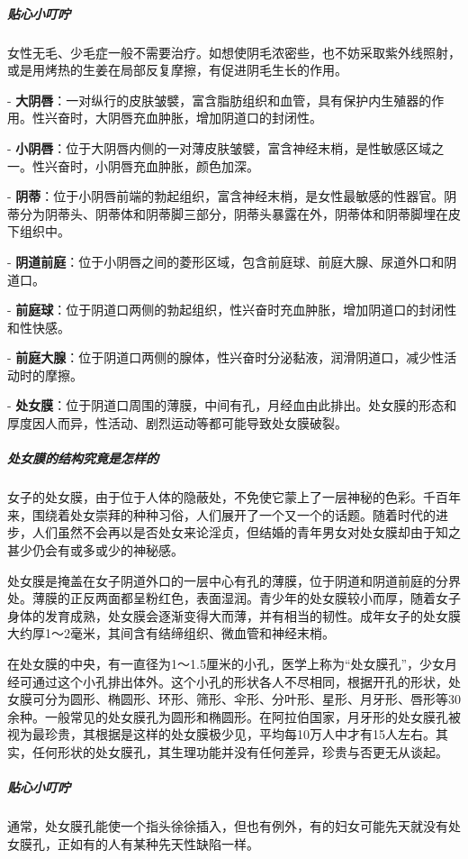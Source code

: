 \begin{enumerate}
\subparagraph{贴心小叮咛}

女性无毛、少毛症一般不需要治疗。如想使阴毛浓密些，也不妨采取紫外线照射，或是用烤热的生姜在局部反复摩擦，有促进阴毛生长的作用。

- \textbf{大阴唇}：一对纵行的皮肤皱襞，富含脂肪组织和血管，具有保护内生殖器的作用。性兴奋时，大阴唇充血肿胀，增加阴道口的封闭性。

- \textbf{小阴唇}：位于大阴唇内侧的一对薄皮肤皱襞，富含神经末梢，是性敏感区域之一。性兴奋时，小阴唇充血肿胀，颜色加深。

- \textbf{阴蒂}：位于小阴唇前端的勃起组织，富含神经末梢，是女性最敏感的性器官。阴蒂分为阴蒂头、阴蒂体和阴蒂脚三部分，阴蒂头暴露在外，阴蒂体和阴蒂脚埋在皮下组织中。

- \textbf{阴道前庭}：位于小阴唇之间的菱形区域，包含前庭球、前庭大腺、尿道外口和阴道口。

- \textbf{前庭球}：位于阴道口两侧的勃起组织，性兴奋时充血肿胀，增加阴道口的封闭性和性快感。

- \textbf{前庭大腺}：位于阴道口两侧的腺体，性兴奋时分泌黏液，润滑阴道口，减少性活动时的摩擦。

- \textbf{处女膜}：位于阴道口周围的薄膜，中间有孔，月经血由此排出。处女膜的形态和厚度因人而异，性活动、剧烈运动等都可能导致处女膜破裂。

\subparagraph{处女膜的结构究竟是怎样的}

女子的处女膜，由于位于人体的隐蔽处，不免使它蒙上了一层神秘的色彩。千百年来，围绕着处女崇拜的种种习俗，人们展开了一个又一个的话题。随着时代的进步，人们虽然不会再以是否处女来论淫贞，但结婚的青年男女对处女膜却由于知之甚少仍会有或多或少的神秘感。

处女膜是掩盖在女子阴道外口的一层中心有孔的薄膜，位于阴道和阴道前庭的分界处。薄膜的正反两面都呈粉红色，表面湿润。青少年的处女膜较小而厚，随着女子身体的发育成熟，处女膜会逐渐变得大而薄，并有相当的韧性。成年女子的处女膜大约厚1～2毫米，其间含有结缔组织、微血管和神经末梢。

在处女膜的中央，有一直径为1～1.5厘米的小孔，医学上称为“处女膜孔”，少女月经可通过这个小孔排出体外。这个小孔的形状各人不尽相同，根据开孔的形状，处女膜可分为圆形、椭圆形、环形、筛形、伞形、分叶形、星形、月牙形、唇形等30余种。一般常见的处女膜孔为圆形和椭圆形。在阿拉伯国家，月牙形的处女膜孔被视为最珍贵，其根据是这样的处女膜极少见，平均每10万人中才有15人左右。其实，任何形状的处女膜孔，其生理功能并没有任何差异，珍贵与否更无从谈起。

\subparagraph{贴心小叮咛}

通常，处女膜孔能使一个指头徐徐插入，但也有例外，有的妇女可能先天就没有处女膜孔，正如有的人有某种先天性缺陷一样。


\end{enumerate}

